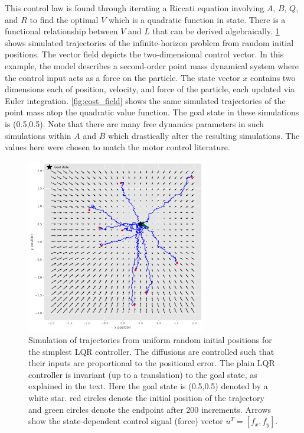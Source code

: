 \documentclass[
  a4paper,
]{article}
\begin{document}
This control law is found through iterating a Riccati equation involving
\(A\), \(B\), \(Q\), and \(R\) to find the optimal \(V\) which is a
quadratic function in state. There is a functional relationship between
\(V\) and \(L\) that can be derived algebraically.
\cref{fig:control_field} shows simulated trajectories of the
infinite-horizon problem from random initial positions. The vector field
depicts the two-dimensional control vector. In this example, the model
describes a second-order point mass dynamical system where the control
input acts as a force on the particle. The state vector \(x\) contains
two dimensions each of position, velocity, and force of the particle,
each updated via Euler integration. \cref{fig:cost_field} shows the same
simulated trajectories of the point mass atop the quadratic value
function. The goal state in these simulations is (0.5,0.5). Note that
there are many free dynamics parameters in such simulations within \(A\)
and \(B\) which drastically alter the resulting simulations. The values
here were chosen to match the motor control literature.

\begin{figure}
\hypertarget{fig:control_field}{%
\centering
\includegraphics[width=0.7\textwidth,height=\textheight]{images/simulations/control_field.pdf}
\caption{Simulation of trajectories from uniform random initial
positions for the simplest LQR controller. The diffusions are controlled
such that their inputs are proportional to the positional error. The
plain LQR controller is invariant (up to a translation) to the goal
state, as explained in the text. Here the goal state is (0.5,0.5)
denoted by a white star. red circles denote the initial position of the
trajectory and green circles denote the endpoint after 200 increments.
Arrows show the state-dependent control signal (force) vector
\(u^T = [f_x,f_y]\).}\label{fig:control_field}
}
\end{figure}
\end{document}

